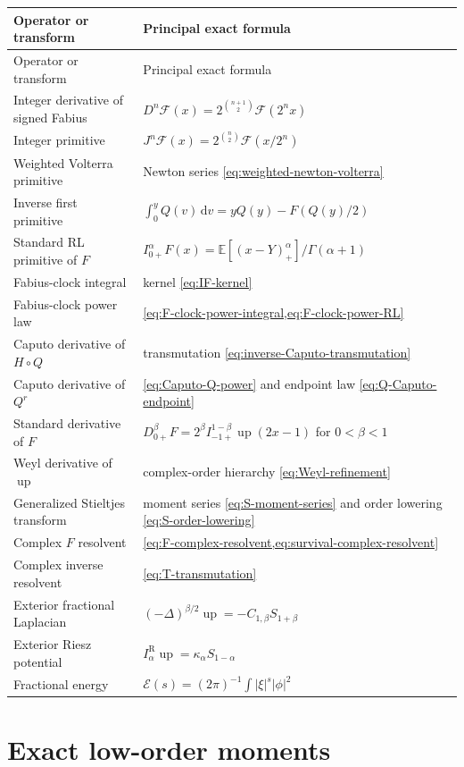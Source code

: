 \documentclass[11pt,oneside]{article}
\numberwithin{equation}{section}
\theoremstyle{plain}
\theoremstyle{definition}
\theoremstyle{remark}
\newcommand{\E}{\mathbb E}
\newcommand{\Up}{\operatorname{up}}
\newcommand{\dd}{\,\mathrm d}
\newcommand{\Fext}{\mathscr F}
\begin{document}
\begin{longtable}{@{}p{}p{}@{}}
\toprule
Operator or transform & Principal exact formula\\
\midrule
\endfirsthead
\toprule
Operator or transform & Principal exact formula\\
\midrule
\endhead
Integer derivative of signed Fabius
& $D^n\Fext(x)=2^{\binom{n+1}{2}}\Fext(2^nx)$\\
Integer primitive
& $J^n\Fext(x)=2^{\binom n2}\Fext(x/2^n)$\\
Weighted Volterra primitive
& Newton series \cref{eq:weighted-newton-volterra}\\
Inverse first primitive
& $\displaystyle\int_0^yQ(v)\dd v=yQ(y)-F(Q(y)/2)$\\
Standard RL primitive of $F$
& $I_{0+}^\alpha F(x)=\E[(x-Y)_+^\alpha]/\Gamma(\alpha+1)$\\
Fabius-clock integral
& kernel \cref{eq:IF-kernel}\\
Fabius-clock power law
& \cref{eq:F-clock-power-integral,eq:F-clock-power-RL}\\
Caputo derivative of $H\circ Q$
& transmutation \cref{eq:inverse-Caputo-transmutation}\\
Caputo derivative of $Q^r$
& \cref{eq:Caputo-Q-power} and endpoint law
  \cref{eq:Q-Caputo-endpoint}\\
Standard derivative of $F$
& $D_{0+}^\beta F=2^\beta I_{-1+}^{1-\beta}\Up(2x-1)$ for $0<\beta<1$\\
Weyl derivative of $\Up$
& complex-order hierarchy \cref{eq:Weyl-refinement}\\
Generalized Stieltjes transform
& moment series \cref{eq:S-moment-series} and order lowering
  \cref{eq:S-order-lowering}\\
Complex $F$ resolvent
& \cref{eq:F-complex-resolvent,eq:survival-complex-resolvent}\\
Complex inverse resolvent
& \cref{eq:T-transmutation}\\
Exterior fractional Laplacian
& $(-\Delta)^{\beta/2}\Up=-C_{1,\beta}S_{1+\beta}$\\
Exterior Riesz potential
& $I_\alpha^{\mathrm R}\Up=\kappa_\alpha S_{1-\alpha}$\\
Fractional energy
& $\mathcal E(s)=(2\pi)^{-1}\int|\xi|^s|\phi|^2$\\
\bottomrule
\end{longtable}

\section{Exact low-order moments}
\end{document}
